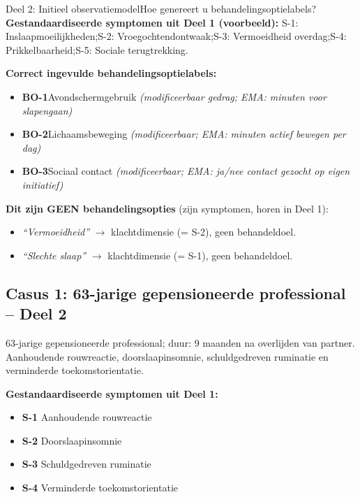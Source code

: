 \documentclass[11pt,a4paper]{article}
\begin{document}
\begin{voorbeeldbox}{Deel 2: Initieel observatiemodel}{Hoe genereert u behandelingsoptielabels?}
\small
\textbf{Gestandaardiseerde symptomen uit Deel 1 (voorbeeld):}
S-1: Inslaapmoeilijkheden;\enspace S-2: Vroegochtendontwaak;\enspace S-3: Vermoeidheid overdag;\enspace S-4: Prikkelbaarheid;\enspace S-5: Sociale terugtrekking.

\medskip
\textbf{Correct ingevulde behandelingsoptielabels:}
\begin{itemize}[topsep=2pt,itemsep=1pt]
\item \textbf{BO-1}\enspace Avondschermgebruik
  \hfill\textit{(modificeerbaar gedrag; EMA: minuten voor slapengaan)}
\item \textbf{BO-2}\enspace Lichaamsbeweging
  \hfill\textit{(modificeerbaar; EMA: minuten actief bewegen per dag)}
\item \textbf{BO-3}\enspace Sociaal contact
  \hfill\textit{(modificeerbaar; EMA: ja/nee contact gezocht op eigen initiatief)}
\end{itemize}

\medskip
\textbf{\color{StrongRed}Dit zijn GEEN behandelingsopties} (zijn symptomen, horen in Deel 1):
\begin{itemize}[topsep=1pt,itemsep=0pt]
\item \textit{``Vermoeidheid''} $\rightarrow$ klachtdimensie (= S-2), geen behandeldoel.
\item \textit{``Slechte slaap''} $\rightarrow$ klachtdimensie (= S-1), geen behandeldoel.
\end{itemize}
\end{voorbeeldbox}

\vspace{0.5em}

\newpage
\subsection*{Casus 1: 63-jarige gepensioneerde professional -- Deel 2}

\begin{complaintbox}[title={Casus 1: verkorte klachtomschrijving}]
\small 63-jarige gepensioneerde professional; duur: 9 maanden na overlijden van partner. Aanhoudende rouwreactie, doorslaapinsomnie, schuldgedreven ruminatie en verminderde toekomstorientatie.
\end{complaintbox}

\begin{contextbox}
\small\textbf{Gestandaardiseerde symptomen uit Deel 1:}
\begin{itemize}[topsep=2pt,itemsep=1pt]
\item \textbf{S-1} Aanhoudende rouwreactie
\item \textbf{S-2} Doorslaapinsomnie
\item \textbf{S-3} Schuldgedreven ruminatie
\item \textbf{S-4} Verminderde toekomstorientatie
\end{itemize}
\end{contextbox}
\end{document}
